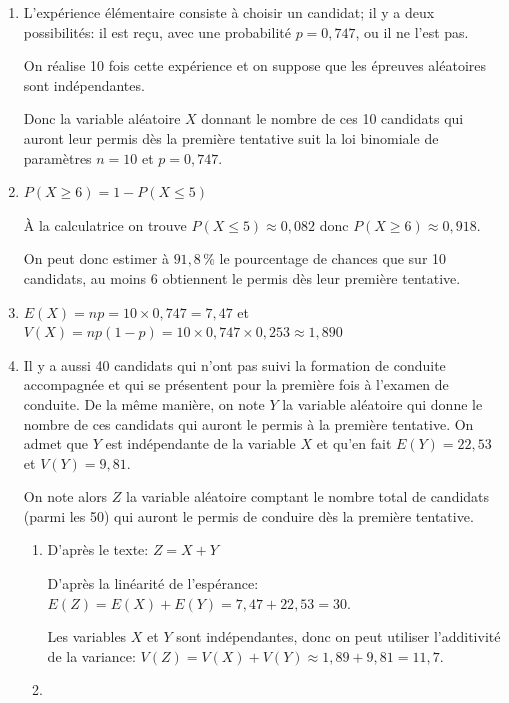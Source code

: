 \documentclass[10pt]{article}
\begin{document}
		\begin{enumerate}
			\item 
L'expérience élémentaire consiste à choisir un candidat; il y a deux possibilités: il est reçu, avec une probabilité $p=0,747$, ou il ne l'est pas.

On réalise 10 fois cette expérience et on suppose que les épreuves aléatoires sont indépendantes.

Donc  la variable aléatoire $X$ donnant le nombre de ces 10 candidats qui auront leur permis dès la première tentative suit la loi binomiale de paramètres $n=10$ et $p=0,747$.

			\item 
$P(X \geqslant 6) = 1-  P(X \leqslant 5)$

À la calculatrice on trouve  $P(X \leqslant 5) \approx 0,082$ donc $P(X \geqslant 6) \approx 0,918$.

On peut donc estimer à $91,8\,\%$ le pourcentage de chances que sur 10 candidats, au moins 6 obtiennent le permis dès leur première tentative.

			\item 
$E(X)=np=10\times 0,747=7,47$ et $V(X)=np\left (1-p\right )=10\times 0,747 \times 0,253 \approx 1,890$

			\item Il y a aussi 40 candidats qui n'ont pas suivi la formation de conduite accompagnée et qui se présentent pour la première fois à l'examen de conduite. De la même manière, on note $Y$ la variable aléatoire qui donne le nombre de ces candidats qui auront le permis à la première tentative. On admet que $Y$ est indépendante de la variable $X$ et qu'en fait $E(Y)=22,53$ et $V(Y)=9,81$.



			On note alors $Z$ la variable aléatoire comptant le nombre total de candidats (parmi les 50) qui auront le permis de conduire dès la première tentative.



			\begin{enumerate}
				\item 
D'après le texte: $Z=X+Y$ 

D'après la linéarité de l'espérance: $E(Z)=E(X)+E(Y) = 7,47+ 22,53 = 30$.

Les variables $X$ et $Y$ sont indépendantes, donc on peut utiliser l'additivité de la variance: $V(Z)=V(X)+V(Y) \approx 1,89 + 9,81 = 11,7$.

	\item 
	

\end{enumerate}
\end{enumerate}
\end{document}
